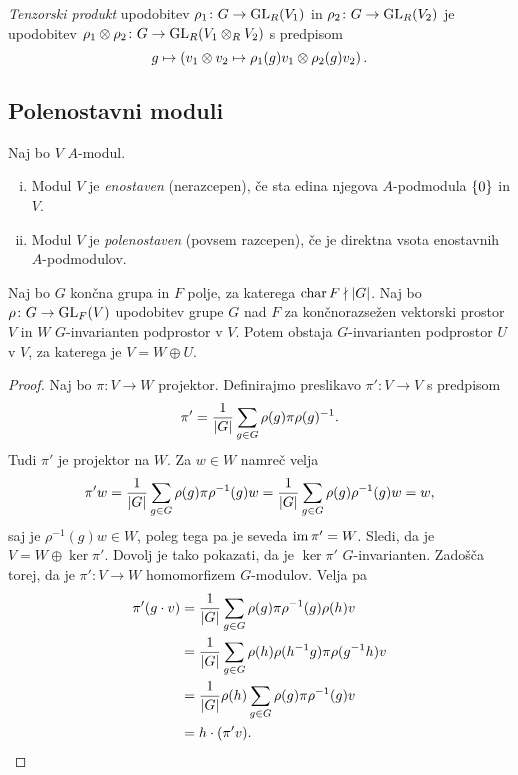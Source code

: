 \begin{definicija}
\emph{Tenzorski produkt}
upodobitev $\rho_1 \colon G \to \operatorname{GL}_R(V_1)$ in
$\rho_2 \colon G \to \operatorname{GL}_R(V_2)$ je upodobitev
$\rho_1 \otimes \rho_2 \colon G \to \operatorname{GL}_R(V_1 \otimes_R V_2)$ s
predpisom
\[
g \mapsto
\left(v_1 \otimes v_2 \mapsto \rho_1(g) v_1 \otimes \rho_2(g) v_2\right).
\]
\end{definicija}

\newpage

\subsection{Polenostavni moduli}

\begin{definicija}
Naj bo $V$ $A$-modul.
\begin{enumerate}[i)]
\item Modul $V$ je \emph{enostaven}
(nerazcepen), če sta edina njegova $A$-podmodula $\left\{0\right\}$ in $V$.
\item Modul $V$ je \emph{polenostaven}
(povsem razcepen), če je direktna vsota enostavnih $A$-podmodulov.
\end{enumerate}
\end{definicija}

\begin{izrek}[Maschke]
Naj bo $G$ končna grupa in $F$ polje, za katerega
$\operatorname{char} F \nmid \left\lvert G\right\rvert$. Naj bo $\rho \colon G \to \operatorname{GL}_F(V)$
upodobitev grupe $G$ nad $F$ za končnorazsežen vektorski prostor
$V$ in $W$ $G$-invarianten podprostor v $V$. Potem obstaja
$G$-invarianten podprostor $U$ v $V$, za katerega je
$V = W \oplus U$.
\end{izrek}

\begin{proof}
Naj bo $\pi \colon V \to W$ projektor. Definirajmo preslikavo
$\pi' \colon V \to V$ s predpisom
\[
\pi' = \frac{1}{\left\lvert G\right\rvert} \sum_{g \in G} \rho(g) \pi \rho(g)^{-1}.
\]
Tudi $\pi'$ je projektor na $W$. Za $w \in W$ namreč velja
\[
\pi' w =
\frac{1}{\left\lvert G\right\rvert} \sum_{g \in G} \rho(g) \pi \rho^{-1}(g) w =
\frac{1}{\left\lvert G\right\rvert} \sum_{g \in G} \rho(g) \rho^{-1}(g) w =
w,
\]
saj je $\rho^{-1}(g) w \in W$, poleg tega pa je seveda
$\operatorname{im} \pi' = W$. Sledi, da je $V = W \oplus \ker \pi'$. Dovolj je
tako pokazati, da je $\ker \pi'$ $G$-invarianten. Zadošča torej, da
je $\pi' \colon V \to W$ homomorfizem $G$-modulov. Velja pa
\begin{align*}
\pi'(g \cdot v) &=
\frac{1}{\left\lvert G\right\rvert}
\sum_{g \in G} \rho(g) \pi \rho^{-1}(g) \rho(h) v
\\
&=
\frac{1}{\left\lvert G\right\rvert}
\sum_{g \in G} \rho(h) \rho(h^{-1} g) \pi \rho(g^{-1} h) v
\\
&=
\frac{1}{\left\lvert G\right\rvert}
\rho(h) \sum_{g \in G} \rho(g) \pi \rho^{-1}(g) v
\\
&=
h \cdot (\pi' v). \qedhere
\end{align*}
\end{proof}

